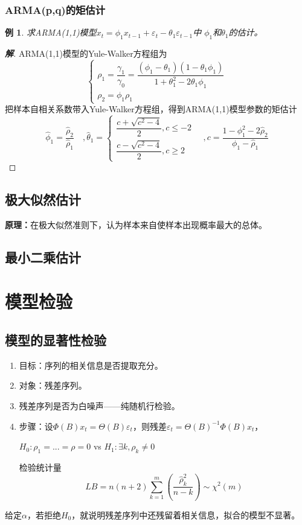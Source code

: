 \documentclass[12pt, a4paper, oneside]{ctexbook}
\newtheorem{example}[theorem]{例}
\newcommand\jie[2]{\begin{proof}[\textbf{#1}]
    #2
\end{proof}}
\begin{document}
\subsubsection{ARMA(p,q)的矩估计}
\begin{example}
    求ARMA(1,1)模型$x_t = \phi_1 x_{t-1} + \varepsilon_t - \theta_1\varepsilon_{t-1}$中
    $\phi_1$和$\theta_1$的估计。
\end{example}
\jie{解}{
    ARMA(1,1)模型的Yule-Walker方程组为
    \begin{equation*}
        \begin{cases}
            \rho_1=\dfrac{\gamma_1}{\gamma_0}=\dfrac{(\phi_1-\theta_1)(1-\theta_1\phi_1)}{1+\theta_1^2-2\theta_1\phi_1} \\
            \rho_2=\phi_1\rho_1
        \end{cases}
    \end{equation*}
    把样本自相关系数带入Yule-Walker方程组，得到ARMA(1,1)模型参数的矩估计
    $$
        \hat{\phi}_1=\frac{\hat{\rho}_2}{\hat{\rho}_1}\quad,
        \hat{\theta}_1=
        \begin{cases}
            \dfrac{c+\sqrt{c^2-4}}2,c\leq-2 \\
            \dfrac{c-\sqrt{c^2-4}}2,c\geq2
        \end{cases}
        \quad,c=\dfrac{1-\phi_1^2-2\hat{\rho}_2}{\phi_1-\hat{\rho}_1}
    $$
}

\subsection{极大似然估计}
\textbf{原理：}在极大似然准则下，认为样本来自使样本出现概率最大的总体。

\subsection{最小二乘估计}

\section{模型检验}
\subsection{模型的显著性检验}
\begin{enumerate}[1、]
    \item 目标：序列的相关信息是否提取充分。
    \item 对象：残差序列。
    \item 残差序列是否为白噪声——纯随机行检验。
    \item 步骤：设$\Phi(B)x_t=\Theta(B)\varepsilon_t$，则残差$\varepsilon_t=\Theta(B)^{-1}\Phi(B)x_t$，
          \begin{center}
              $H_0:\rho_1 = ... = \rho = 0$ vs
              $H_1: \exists k, \rho_k \neq 0$
          \end{center}
          检验统计量
          $$
              LB=n(n+2)\sum_{k=1}^m(\frac{\hat{\rho}_k^2}{n-k})\sim\chi^2(m)
          $$
\end{enumerate}
给定$\alpha$，若拒绝$H_0$，就说明残差序列中还残留着相关信息，拟合的模型不显著。
\end{document}
